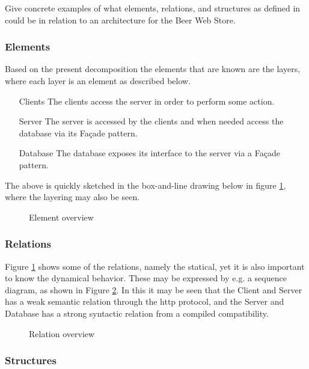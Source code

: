 \begin{question}
Give concrete examples of what elements, relations, and structures as defined in \cite{bass2003sa} could be in relation to an architecture for the Beer Web Store.
\end{question}

\subsubsection{Elements}
Based on the present decomposition the elements that are known are the layers, where each layer is an element as described below.
\begin{itemize}
    \item[Clients] The clients access the server in order to perform some action.
    \item[Server] The server is accessed by the clients and when needed access the database via its Fa\c cade pattern.
    \item[Database] The database exposes its interface to the server via a Fa\c cade pattern.
\end{itemize}
The above is quickly sketched in the box-and-line drawing below in figure \ref{fig:module_view}, where the layering may also be seen. 
\begin{figure}[!htb]
\centerline{}
\caption{Element overview}
\label{fig:module_view}
\end{figure}

\subsubsection{Relations}
Figure \ref{fig:module_view} shows some of the relations, namely the statical, yet it is also important to know the dynamical behavior. These may be expressed by e.g. a sequence diagram, as shown in Figure \ref{fig:sequence}. In this it may be seen that the Client and Server has a weak semantic relation through the http protocol, and the Server and Database has a strong syntactic relation from a compiled compatibility. 

\begin{figure}[!htb]
\centerline{}
\caption{Relation overview}
\label{fig:sequence}
\end{figure}

\subsubsection{Structures}

